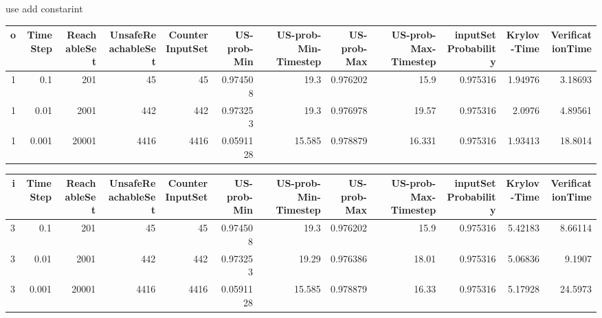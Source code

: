 use add constarint
\begin{tabular}{rrrrrrrrrrrr}
\hline
   o &   TimeStep &   ReachableSet &   UnsafeReachableSet &   CounterInputSet &   US-prob-Min &   US-prob-Min-Timestep &   US-prob-Max &   US-prob-Max-Timestep &   inputSet Probability &   Krylov-Time &   VerificationTime \\
\hline
   1 &      0.1   &            201 &                   45 &                45 &     0.974508  &                 19.3   &      0.976202 &                 15.9   &               0.975316 &       1.94976 &            3.18693 \\
   1 &      0.01  &           2001 &                  442 &               442 &     0.973253  &                 19.3   &      0.976978 &                 19.57  &               0.975316 &       2.0976  &            4.89561 \\
   1 &      0.001 &          20001 &                 4416 &              4416 &     0.0591128 &                 15.585 &      0.978879 &                 16.331 &               0.975316 &       1.93413 &           18.8014  \\
\hline
\end{tabular}
\begin{tabular}{rrrrrrrrrrrr}
\hline
   i &   TimeStep &   ReachableSet &   UnsafeReachableSet &   CounterInputSet &   US-prob-Min &   US-prob-Min-Timestep &   US-prob-Max &   US-prob-Max-Timestep &   inputSet Probability &   Krylov-Time &   VerificationTime \\
\hline
   3 &      0.1   &            201 &                   45 &                45 &     0.974508  &                 19.3   &      0.976202 &                  15.9  &               0.975316 &       5.42183 &            8.66114 \\
   3 &      0.01  &           2001 &                  442 &               442 &     0.973253  &                 19.29  &      0.976386 &                  18.01 &               0.975316 &       5.06836 &            9.1907  \\
   3 &      0.001 &          20001 &                 4416 &              4416 &     0.0591128 &                 15.585 &      0.978879 &                  16.33 &               0.975316 &       5.17928 &           24.5973  \\
\hline
\end{tabular}



